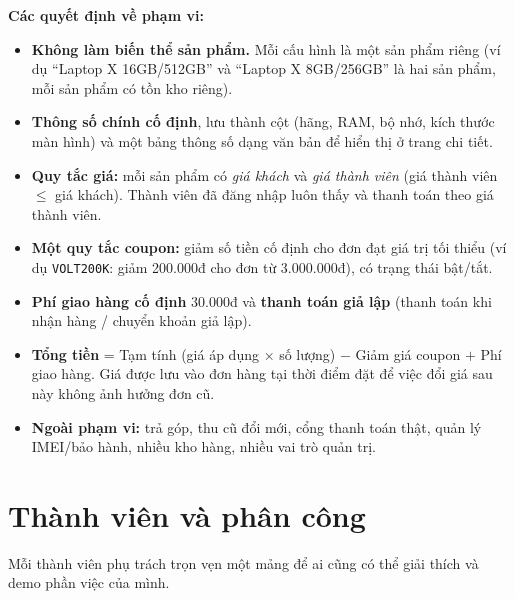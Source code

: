 \documentclass[12pt,a4paper]{article}   %
\begin{document}
\textbf{Các quyết định về phạm vi:}
\begin{itemize}
  \item \textbf{Không làm biến thể sản phẩm.} Mỗi cấu hình là một sản phẩm riêng
        (ví dụ ``Laptop X 16GB/512GB'' và ``Laptop X 8GB/256GB'' là hai sản phẩm,
        mỗi sản phẩm có tồn kho riêng).
  \item \textbf{Thông số chính cố định}, lưu thành cột (hãng, RAM, bộ nhớ, kích thước màn hình)
        và một bảng thông số dạng văn bản để hiển thị ở trang chi tiết.
  \item \textbf{Quy tắc giá:} mỗi sản phẩm có \emph{giá khách} và \emph{giá thành viên}
        (giá thành viên $\le$ giá khách). Thành viên đã đăng nhập luôn thấy và thanh toán theo giá thành viên.
  \item \textbf{Một quy tắc coupon:} giảm số tiền cố định cho đơn đạt giá trị tối thiểu
        (ví dụ \texttt{VOLT200K}: giảm 200{.}000đ cho đơn từ 3{.}000{.}000đ), có trạng thái bật/tắt.
  \item \textbf{Phí giao hàng cố định} 30{.}000đ và \textbf{thanh toán giả lập}
        (thanh toán khi nhận hàng / chuyển khoản giả lập).
  \item \textbf{Tổng tiền} = Tạm tính (giá áp dụng $\times$ số lượng) $-$ Giảm giá coupon $+$ Phí giao hàng.
        Giá được lưu vào đơn hàng tại thời điểm đặt để việc đổi giá sau này không ảnh hưởng đơn cũ.
  \item \textbf{Ngoài phạm vi:} trả góp, thu cũ đổi mới, cổng thanh toán thật, quản lý IMEI/bảo hành,
        nhiều kho hàng, nhiều vai trò quản trị.
\end{itemize}

\section{Thành viên và phân công}

Mỗi thành viên phụ trách trọn vẹn một mảng để ai cũng có thể giải thích và demo phần việc của mình.
\end{document}
